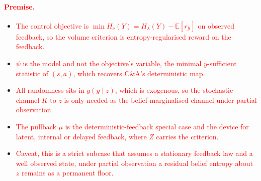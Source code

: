 \documentclass[10pt]{article}
\newcommand{\add}[1]{\textcolor{red}{#1}}
\begin{document}
\paragraph{\add{Premise.}}
\begin{itemize}
  \item \add{The control objective is $\min H_\nu(Y) = H_\lambda(Y) - \mathbb E[r_{\mathcal Y}]$ on observed feedback, so the volume criterion is entropy-regularised reward on the feedback.}
  \item \add{$\psi$ is the model and not the objective's variable, the minimal $y$-sufficient statistic of $(s,a)$, which recovers C\&A's deterministic map.}
  \item \add{All randomness sits in $g(y \mid z)$, which is exogenous, so the stochastic channel $K$ to $z$ is only needed as the belief-marginalised channel under partial observation.}
  \item \add{The pullback $\mu$ is the deterministic-feedback special case and the device for latent, internal or delayed feedback, where $Z$ carries the criterion.}
  \item \add{Caveat, this is a strict subcase that assumes a stationary feedback law and a well observed state, under partial observation a residual belief entropy about $z$ remains as a permanent floor.}
\end{itemize}
\end{document}
